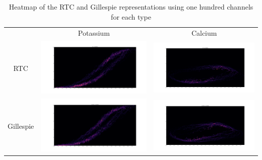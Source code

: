 \begin{table}[]
    \centering
    \begin{tabular}{ccc}
    & Potassium & Calcium\\
    RTC &
    \includegraphics[width=.45\linewidth,valign=m]{Figures/100/K_RTC_.png} &
    \includegraphics[width=.45\linewidth,valign=m]{Figures/100/Ca_RTC_.png} \\
    Gillespie &
    \includegraphics[width=.45\linewidth,valign=m]{Figures/100/K_GILLESPIE_.png} &
        \includegraphics[width=.45\linewidth,valign=m]{Figures/100/Ca_GILLESPIE_.png} \\
    \end{tabular}
    \caption{Heatmap of the RTC and Gillespie representations using one hundred channels for each type}
    \label{tab:my_label}
\end{table}

